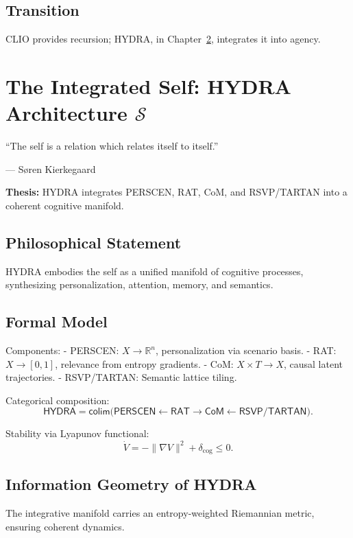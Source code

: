 \documentclass[12pt]{book}
\theoremstyle{definition}
\begin{document}
\section{Transition}
CLIO provides recursion; HYDRA, in Chapter~\ref{chap:hydra}, integrates it into agency.

\chapter{The Integrated Self: HYDRA Architecture \texorpdfstring{\(\mathcal{S}\)}{S}}
\label{chap:hydra}
\epigraph{``The self is a relation which relates itself to itself.''}{--- Søren Kierkegaard}

\textbf{Thesis:} HYDRA integrates PERSCEN, RAT, CoM, and RSVP/TARTAN into a coherent cognitive manifold.

\section{Philosophical Statement}
HYDRA embodies the self as a unified manifold of cognitive processes, synthesizing personalization, attention, memory, and semantics.

\section{Formal Model}
Components:
- \textsf{PERSCEN}: \(X \to \mathbb{R}^n\), personalization via scenario basis.
- \textsf{RAT}: \(X \to [0,1]\), relevance from entropy gradients.
- \textsf{CoM}: \(X \times T \to X\), causal latent trajectories.
- \textsf{RSVP/TARTAN}: Semantic lattice tiling.

Categorical composition:
\begin{equation}
\textsf{HYDRA} = \textsf{colim}\Big( \textsf{PERSCEN} \xleftarrow{} \textsf{RAT} \xrightarrow{} \textsf{CoM} \xleftarrow{} \textsf{RSVP/TARTAN} \Big).
\end{equation}

Stability via Lyapunov functional:
\begin{equation}
\dot{V} = -\|\nabla V\|^2 + \delta_{\text{cog}} \leq 0.
\end{equation}

\section{Information Geometry of HYDRA}
The integrative manifold carries an entropy-weighted Riemannian metric, ensuring coherent dynamics.
\end{document}
